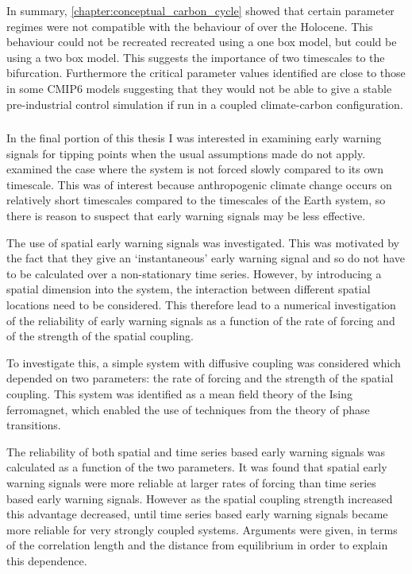 In summary, \cref{chapter:conceptual_carbon_cycle} showed that certain parameter regimes were not compatible with the behaviour of  over the Holocene.
This behaviour could not be recreated recreated using a one box model, but could be using a two box model. This suggests the importance of two timescales to the bifurcation.
Furthermore the critical parameter values identified are close to those in
some CMIP6 models suggesting that they would not be able to give a stable pre-industrial control simulation if run in a coupled climate-carbon configuration.

\subsubsection{}

In the final portion of this thesis I was interested in examining early warning signals for tipping points when the usual assumptions made do not apply.
 examined the case where the system is not forced slowly compared to its own timescale. This was of interest because anthropogenic climate change
occurs on relatively short timescales compared to the timescales of the Earth system, so there is reason to suspect that early warning signals may be less effective.

The use of spatial early warning signals was investigated. This was motivated by the fact that they give an `instantaneous' early warning signal and so do not have
to be calculated over a non-stationary time series. However, by introducing a spatial dimension into the system, the interaction between different spatial locations
need to be considered. This therefore lead to a numerical investigation of the reliability of early warning signals as a function of the rate of forcing and of the strength of
the spatial coupling.

To investigate this, a simple system with diffusive coupling was considered which depended on two parameters: the rate of forcing and the strength of the spatial coupling.
This system was identified as a mean field theory of the Ising ferromagnet, which enabled the use of techniques from the theory of phase transitions.

The reliability of both spatial and time series based early warning signals was calculated as a function of the two parameters.
It was found that spatial early warning signals were more reliable at larger rates of forcing than time series based early warning signals. However as the spatial coupling
strength increased this advantage decreased, until time series based early warning signals became more reliable for very strongly coupled systems. Arguments were given, in terms of the correlation
length and the distance from equilibrium in order to explain this dependence.

